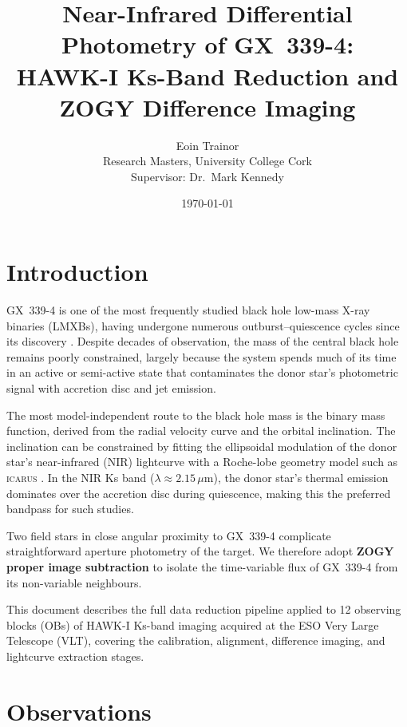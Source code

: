 \documentclass[12pt,a4paper]{article}
\title{Near-Infrared Differential Photometry of GX~339-4:\\
       HAWK-I Ks-Band Reduction and ZOGY Difference Imaging}
\author{Eoin Trainor\\
        \small Research Masters, University College Cork\\
        \small Supervisor: Dr.\ Mark Kennedy}
\date{\today}
\begin{document}
\maketitle
\tableofcontents
\newpage

\section{Introduction}
\label{sec:intro}

GX~339-4 is one of the most frequently studied black hole low-mass X-ray
binaries (LMXBs), having undergone numerous outburst--quiescence cycles since
its discovery \citep{Markert1973}. Despite decades of observation, the mass of
the central black hole remains poorly constrained, largely because the system
spends much of its time in an active or semi-active state that contaminates the
donor star's photometric signal with accretion disc and jet emission.

The most model-independent route to the black hole mass is the binary mass
function, derived from the radial velocity curve and the orbital inclination.
The inclination can be constrained by fitting the ellipsoidal modulation of the
donor star's near-infrared (NIR) lightcurve with a Roche-lobe geometry model
such as \textsc{icarus} \citep{Breton2012}. In the NIR Ks band ($\lambda
\approx 2.15\,\mu$m), the donor star's thermal emission dominates over the
accretion disc during quiescence, making this the preferred bandpass for such
studies.

Two field stars in close angular proximity to GX~339-4 complicate
straightforward aperture photometry of the target. We therefore adopt
\textbf{ZOGY proper image subtraction} \citep{Zackay2016} to isolate the
time-variable flux of GX~339-4 from its non-variable neighbours.

This document describes the full data reduction pipeline applied to 12
observing blocks (OBs) of HAWK-I Ks-band imaging acquired at the ESO Very
Large Telescope (VLT), covering the calibration, alignment, difference imaging,
and lightcurve extraction stages.

\section{Observations}
\label{sec:obs}
\end{document}
